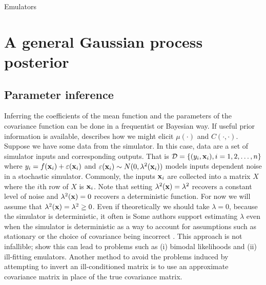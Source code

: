 \begin{chapter}{Emulators \label{Ch:Emulators}}
\section{A general Gaussian process posterior}

\subsection{Parameter inference}
Inferring the coefficients of the mean function and the parameters of the covariance function can be done in a frequentist or Bayesian way. If useful prior information is available, \citet{Oakley2002} describes how we might elicit $\mu(\cdot)$ and $C(\cdot, \cdot)$. Suppose we have some data from the simulator. In this case, data are a set of simulator inputs and corresponding outputs. That is $\mathcal{D} = \{ (y_i, \mathbf{x}_i), i = 1, 2, \ldots, n \} $ where $y_i = f(\mathbf{x}_i) + \varepsilon(\mathbf{x}_i)$ and $\varepsilon(\mathbf{x}_i) \sim N(0, \lambda^2(\mathbf{x}_i))$ models inputs dependent noise in a stochastic simulator. Commonly, the inputs $\mathbf{x}_i$ are collected into a matrix $X$ where the $i$th row of $X$ is $\mathbf{x}_i$. Note that setting $\lambda^2(\mathbf{x}) = \lambda^2$ recovers a constant level of noise and  $\lambda^2(\mathbf{x}) = 0$ recovers a deterministic function. For now we will assume that $\lambda^2(\mathbf{x}) = \lambda^2 \geq 0$. Even if theoretically we should take $\lambda = 0$, because the simulator is deterministic, it often is  Some authors support estimating $\lambda$ even when the simulator is deterministic as a way to account for assumptions such as stationary or the choice of covariance being incorrect \citep{Gramacy12}. This approach is not infallible; \citet{Andrianakis2012} show this can lead to problems such as (i) bimodal likelihoods and (ii) ill-fitting emulators. Another method to avoid the problems induced by attempting to invert an ill-conditioned matrix is to use an approximate covariance matrix in place of the true covariance matrix. 


\end{chapter}
